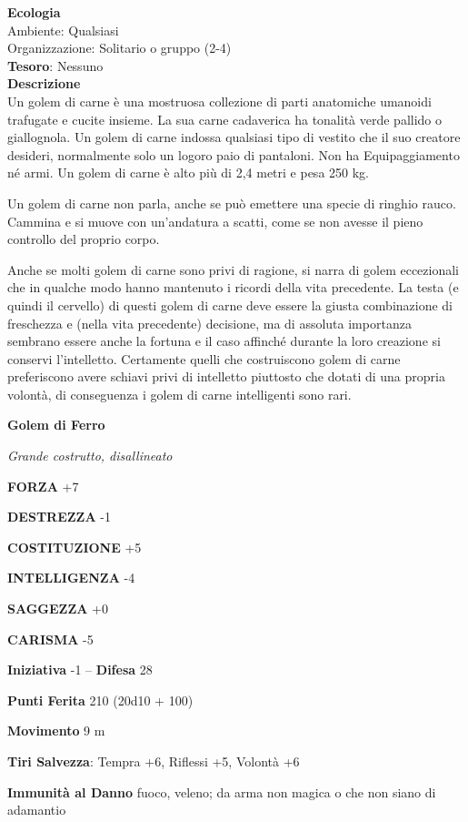 \begin{multicols}{2}
\textbf{Ecologia}\\
Ambiente: Qualsiasi\\
Organizzazione: Solitario o gruppo (2-4)\\
\textbf{Tesoro}: Nessuno\\
\textbf{Descrizione}\\
Un golem di carne è una mostruosa collezione di parti anatomiche umanoidi trafugate e cucite insieme. La sua carne cadaverica ha tonalità verde pallido o giallognola. Un golem di carne indossa qualsiasi tipo di vestito che il suo creatore desideri, normalmente solo un logoro paio di pantaloni. Non ha Equipaggiamento né armi. Un golem di carne è alto più di 2,4 metri e pesa 250 kg.

Un golem di carne non parla, anche se può emettere una specie di ringhio rauco. Cammina e si muove con un'andatura a scatti, come se non avesse il pieno controllo del proprio corpo.

Anche se molti golem di carne sono privi di ragione, si narra di golem eccezionali che in qualche modo hanno mantenuto i ricordi della vita precedente. La testa (e quindi il cervello) di questi golem di carne deve essere la giusta combinazione di freschezza e (nella vita precedente) decisione, ma di assoluta importanza sembrano essere anche la fortuna e il caso affinché durante la loro creazione si conservi l'intelletto. Certamente quelli che costruiscono golem di carne preferiscono avere schiavi privi di intelletto piuttosto che dotati di una propria volontà, di conseguenza i golem di carne intelligenti sono rari.


\medskip{}\textbf{Golem di Ferro}

\textit{Grande costrutto, disallineato}

\textbf{FORZA} +7

\textbf{DESTREZZA} -1

\textbf{COSTITUZIONE} +5

\textbf{INTELLIGENZA} -4

\textbf{SAGGEZZA} +0

\textbf{CARISMA} -5

\textbf{Iniziativa} -1 -- \textbf{Difesa} 28

\textbf{Punti Ferita} 210 (20d10 + 100)

\textbf{Movimento} 9 m

\textbf{Tiri Salvezza}: Tempra +6, Riflessi +5, Volontà +6

\textbf{Immunità al Danno} fuoco, veleno; da arma non magica o che non siano di adamantio


\end{multicols}
